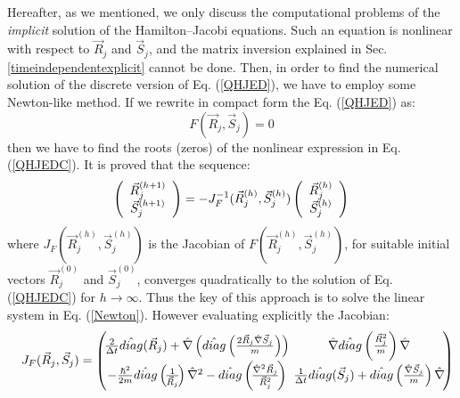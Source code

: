 \documentclass[nofootinbib, secnumarabic, amsmath, nobibnotes,10pt,aps,pra]{revtex4-1}
\newcommand{\sref}[1]{Sec. \ref{#1}}
\newcommand{\eref}[1]{Eq. (\ref{#1})}
\begin{document}
Hereafter, as we mentioned, we only discuss the computational
problems of the \textit{implicit} solution of the Hamilton--Jacobi
equations. Such an equation is nonlinear with respect to $\vec
{R}_{j}$ and $\vec {S}_{j}$, and the matrix inversion explained in
\sref{timeindependentexplicit} cannot be done. Then, in order to
find the numerical solution of the discrete version of \eref{QHJED},
we have to employ some Newton-like method. If we rewrite in compact
form the \eref{QHJED} as:
\begin{equation}
F(\vec {R}_{j},\vec {S}_{j}) = 0 \label{QHJEDC}%
\end{equation}
then we have to find the roots (zeros) of the nonlinear expression in \eref{QHJEDC}. It is proved that the sequence:
\begin{equation}
\left(
\begin{array}
[c]{c}%
\vec {R}_{j}^{(h + 1)}\\
\vec {S}_{j}^{(h + 1)}%
\end{array}
\right) = -J_{F}^{-1}(\vec {R}_{j}^{(h)},\vec {S}_{j}^{(h)})\left(
\begin{array}
[c]{c}%
\vec {R}_{j}^{(h)}\\
\vec {S}_{j}^{(h)}%
\end{array}
\right) \label{Newton}%
\end{equation}
where $J_{F}(\vec {R}_{j}^{(h)},\vec {S}_{j}^{(h)})$ is the Jacobian
of $F(\vec {R}_{j}^{(h)},\vec {S}_{j}^{(h)})$, for suitable initial
vectors $\vec {R}_{j}^{(0)}$ and $\vec {S}_{j}^{(0)}$, converges quadratically  to
the solution of \eref{QHJEDC} for $h\rightarrow\infty$. Thus the key
of this approach is to solve the linear system in \eref{Newton}.
However evaluating explicitly the Jacobian:
{\begin{eqnarray}
&&J_{F}(\vec {R}_{j},\vec {S}_{j}) =\left(\!
\begin{array}
[c]{@{}c@{\ }c@{}}%
\frac{2}{\Delta t}\hat{diag}(\vec {R}_{j}) + \hat{\nabla}\left( \hat{diag}\left(\frac
{2\vec {R}_{j}\hat{\nabla}\vec {S}_{j}}{m}\right)\right) & \hat{\nabla
}\hat{diag}\left( \frac{\vec {R}_{j}^{2}}{m}\right) \hat{\nabla}\\
-\frac{\hbar^{2}}{2m}\hat{diag}\left(\! \frac{1}{\vec {R}_{j}}\!\right)
\hat{\nabla}^{2} - \hat{diag}\left(\! \frac{\hat{\nabla}^{2}\vec {R}_{j}}%
{\vec {R}_{j}^{2}}\!\right) & \frac{1}{\Delta t}\hat{diag}(\vec {S}%
_{j}) + \hat{diag}\left( \frac{\hat{\nabla}\vec {S}_{j}}{m}\right) \hat{\nabla}%
\end{array}\!
\right)\nonumber\\ 
\end{eqnarray}}
\end{document}
